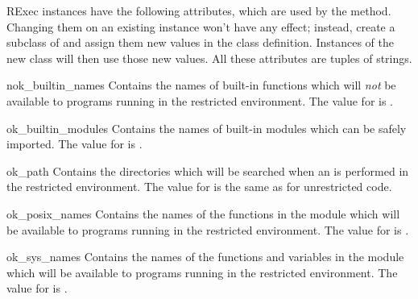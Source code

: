 RExec instances have the following attributes, which are used by the
 method.  Changing them on an existing instance won't
have any effect; instead, create a subclass of  and assign
them new values in the class definition.  Instances of the new class
will then use those new values.  All these attributes are tuples of
strings.

\renewcommand{\indexsubitem}{(RExec object attribute)}
\begin{datadesc}{nok_builtin_names}
Contains the names of built-in functions which will \emph{not} be
 available to programs running in the restricted environment.  The
 value for  is  
 .
\end{datadesc}

\begin{datadesc}{ok_builtin_modules}
Contains the names of built-in modules which can be safely imported.
The value for  is   
      
   .
\end{datadesc}

\begin{datadesc}{ok_path}
Contains the directories which will be searched when an 
is performed in the restricted environment.  
The value for  is the same as  for
unrestricted code.
\end{datadesc}

\begin{datadesc}{ok_posix_names}
Contains the names of the functions in the  module which will be
available to programs running in the restricted environment.  The
value for  is  
   
   
   
.
\end{datadesc}

\begin{datadesc}{ok_sys_names}
Contains the names of the functions and variables in the  module which will be
available to programs running in the restricted environment.  The
value for  is  
   
.
\end{datadesc}

